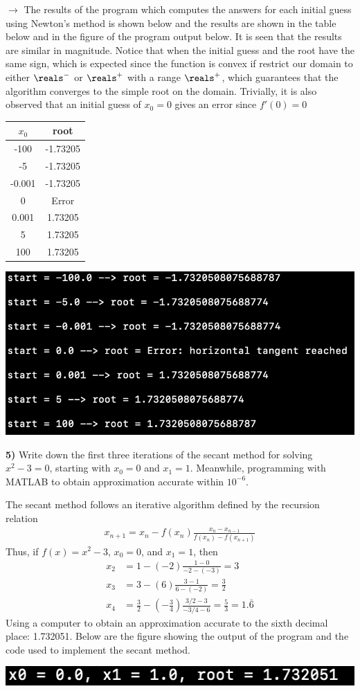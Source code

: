 \documentclass[12pt,a4paper]{article}
\newcommand{\prob}[2]{\textbf{#1)} #2}
\begin{document}
$\rightarrow$ The results of the program which computes the answers for each initial guess using Newton's method is shown below and the results are shown in the table below and in the figure of the program output below. It is seen that the results are similar in magnitude. Notice that when the initial guess and the root have the same sign, which is expected since the function is convex if restrict our domain to either $\reals^{-}$ or $\reals^{+}$ with a range $\reals^{+}$, which guarantees that the algorithm converges to the simple root on the domain. Trivially, it is also observed that an initial guess of $x_0 = 0$ gives an error since $f'(0) = 0$
\begin{table}[H]
\begin{center}
\begin{tabular}{c|c}
$x_0$ & root \\
\hline
-100 & -1.73205 \\
-5 & -1.73205 \\
-0.001 & -1.73205 \\
0 & Error \\
0.001 & 1.73205 \\
5 & 1.73205 \\
100 & 1.73205 
\end{tabular}
\end{center}
\end{table}
\bef
\includegraphics[scale=0.75]{fig2.png}
\eef


\prob{5}{Write down the first three iterations of the secant method for solving $x^2-3 = 0$, starting with $x_0=0$ and $x_1 = 1$. Meanwhile, programming with MATLAB to obtain approximation accurate within $10^{-6}$.}

The secant method follows an iterative algorithm defined by the recursion relation
\begin{align*}
x_{n+1} = x_n - f(x_n)\frac{x_n - x_{n-1}}{f(x_n) - f(x_{n+1})}
\end{align*} 
Thus, if $f(x) = x^2-3$, $x_0 = 0$, and $x_1 = 1$, then
\begin{align*}
x_2 &= 1 - (-2)\frac{1-0}{-2-(-3)} = 3 \\
x_3 &= 3 - (6)\frac{3-1}{6-(-2)} = \frac{3}{2} \\
x_4 &= \frac{3}{2} - \left(-\frac{3}{4}\right)\frac{3/2 - 3}{-3/4 - 6} = \frac{5}{3} = 1.\bar{6}
\end{align*}
Using a computer to obtain an approximation accurate to the sixth decimal place: 1.732051. Below are the figure showing the output of the program and the code used to implement the secant method.

\bef
\includegraphics[scale=1]{fig3.png}
\eef

\end{document}
